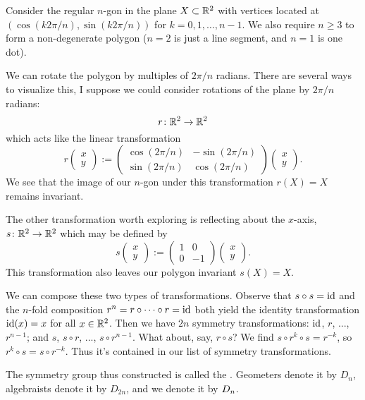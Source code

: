 \begin{example}[Dihedral]
Consider the regular $n$-gon in the plane $X\subset\mathbb{R}^{2}$ with
vertices located at $(\cos(k2\pi/n), \sin(k2\pi/n))$ for
$k=0,1,\dots,n-1$. We also require $n\geq3$ to form a non-degenerate
polygon ($n=2$ is just a line segment, and $n=1$ is one dot).

We can rotate the polygon by multiples of $2\pi/n$ radians. There are
several ways to visualize this, I suppose we could consider rotations of
the plane by $2\pi/n$ radians:
\begin{equation}
  r\colon\mathbb{R}^{2}\to\mathbb{R}^{2}
\end{equation}
which acts like the linear transformation
\begin{equation}
  r
  \begin{pmatrix}
    x\\
    y
  \end{pmatrix}
  :=
  \begin{pmatrix}
    \cos(2\pi/n) & -\sin(2\pi/n)\\
    \sin(2\pi/n) & \cos(2\pi/n)
  \end{pmatrix}
  \begin{pmatrix}
    x\\
    y
  \end{pmatrix}.
\end{equation}
We see that the image of our $n$-gon under this transformation $r(X)=X$
remains invariant.

The other transformation worth exploring is reflecting about the
$x$-axis, $s\colon\mathbb{R}^{2}\to\mathbb{R}^{2}$ which may be defined by
\begin{equation}
  s
  \begin{pmatrix}
    x\\
    y
  \end{pmatrix}
  :=
  \begin{pmatrix}
    1 & 0\\
    0 & -1
  \end{pmatrix}
  \begin{pmatrix}
    x\\
    y
  \end{pmatrix}.
\end{equation}
This transformation also leaves our polygon invariant $s(X)=X$.

We can compose these two types of transformations. Observe that
$s\circ s=\mathrm{id}$ and the $n$-fold composition $r^{n}=r\circ\dots\circ r=\mathrm{id}$
both yield the identity transformation $\mathrm{id}(x)=x$ for all $x\in\mathbb{R}^{2}$.
Then we have $2n$ symmetry transformations: $\mathrm{id}$, $r$, ..., $r^{n-1}$;
and $s$, $s\circ r$, ..., $s\circ r^{n-1}$. What about, say, $r\circ s$?
We find $s\circ r^{k}\circ s=r^{-k}$, so $r^{k}\circ s = s\circ r^{-k}$.
Thus it's contained in our list of symmetry transformations.

The symmetry group thus constructed is called the .
Geometers denote it by $D_{n}$, algebraists denote it by $D_{2n}$, and
we denote it by $D_{n}$.
\end{example}

